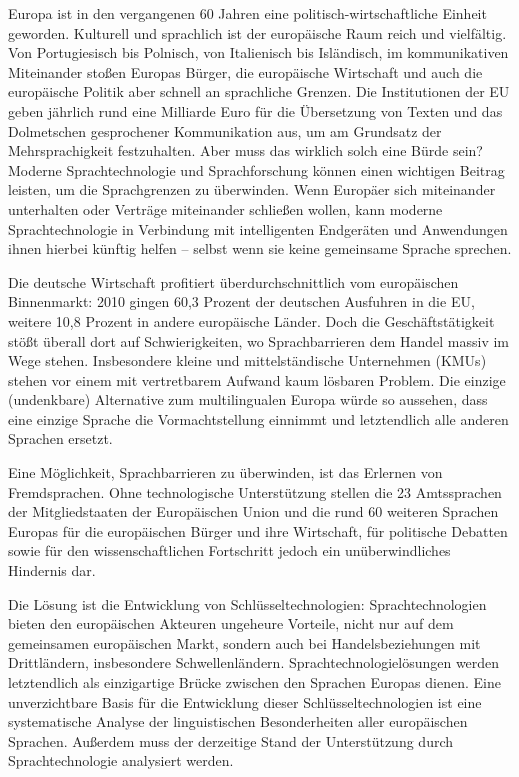\documentclass[]{../../metanetpaper}
\begin{document}
\begin{Parallel}[c]{79mm}{78mm}
{Europa ist in den vergangenen 60 Jahren eine politisch-wirtschaftliche Einheit geworden. Kulturell und sprachlich ist der europäische Raum reich und vielfältig. Von Portugiesisch bis Polnisch, von Italienisch bis Isländisch, im kommunikativen Miteinander stoßen Europas Bürger, die europäische Wirtschaft und auch die europäische Politik aber schnell an sprachliche Grenzen. Die Institutionen der EU geben jährlich rund eine Milliarde Euro für die Übersetzung von Texten und das Dolmetschen gesprochener Kommunikation aus, um am Grundsatz der Mehrsprachigkeit festzuhalten. Aber muss das wirklich solch eine Bürde sein? Moderne Sprachtechnologie und Sprachforschung können einen wichtigen Beitrag leisten, um die Sprachgrenzen zu überwinden. Wenn Europäer sich miteinander unterhalten oder Verträge miteinander schließen wollen, kann moderne Sprachtechnologie in Verbindung mit intelligenten Endgeräten und Anwendungen ihnen hierbei künftig helfen – selbst wenn sie keine gemeinsame Sprache sprechen. 

Die deutsche Wirtschaft profitiert überdurchschnittlich vom europäischen Binnenmarkt: 2010 gingen 60,3 Prozent der deutschen Ausfuhren in die EU, weitere 10,8 Prozent in andere europäische Länder. Doch die Geschäftstätigkeit stößt überall dort auf Schwierigkeiten, wo Sprachbarrieren dem Handel massiv im Wege stehen. Insbesondere kleine und mittelständische Unternehmen (KMUs) stehen vor einem mit vertretbarem Aufwand kaum lösbaren Problem. Die einzige (undenkbare) Alternative zum multilingualen Europa würde so aussehen, dass eine einzige Sprache die Vormachtstellung einnimmt und letztendlich alle anderen Sprachen ersetzt. 

Eine Möglichkeit, Sprachbarrieren zu überwinden, ist das Erlernen von Fremdsprachen. Ohne technologische Unterstützung stellen die 23 Amts\-sprachen der Mitgliedstaaten der Europäischen Union und die rund 60 weiteren Sprachen Europas für die europäischen Bürger und ihre Wirtschaft, für politische Debatten sowie für den wissenschaftlichen Fortschritt jedoch ein unüberwindliches Hindernis dar. 

Die Lösung ist die Entwicklung von Schlüsseltechnologien: Sprachtechnologien bieten den europäischen Akteuren ungeheure Vorteile, nicht nur auf dem gemeinsamen europäischen Markt, sondern auch bei Handelsbeziehungen mit Drittländern, insbesondere Schwellenländern. Sprachtechnologielösungen werden letztendlich als einzigartige Brücke zwischen den Sprachen Europas dienen. Eine unverzichtbare Basis für die Entwicklung dieser Schlüsseltechnologien ist eine systematische Analyse der linguistischen Besonderheiten aller europäischen Sprachen. Außerdem muss der derzeitige Stand der Unterstützung durch Sprachtechnologie analysiert werden. 
    
}
\end{Parallel}
\end{document}
